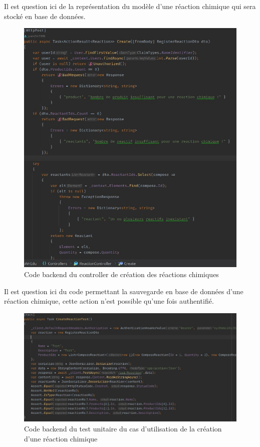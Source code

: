 Il est question ici de la représentation du modèle d'une réaction chimique qui sera stocké en base de données.

\begin{figure}[H]
	\centering
	\includegraphics[width=1\textwidth]{img/crec}
	\caption{Code backend du controller de création des réactions chimiques}
\end{figure}

Il est question ici du code permettant la sauvegarde en base de données d'une réaction chimique, cette action n'est possible qu'une fois authentifié.

\begin{figure}[H]
	\centering
	\includegraphics[width=1\textwidth]{img/creac}
	\caption{Code backend du test unitaire du cas d'utilisation de la création d'une réaction chimique}
\end{figure}

